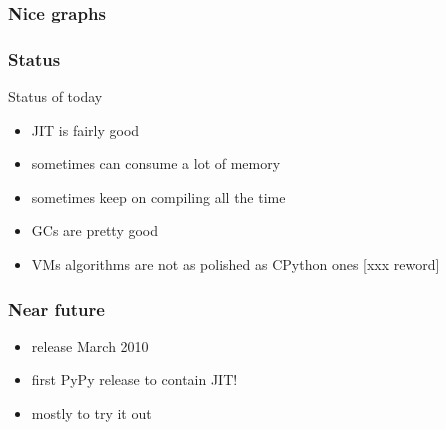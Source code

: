 \documentclass[utf8x, 14pt]{beamer}
\begin{document}
\begin{frame}
  \frametitle{Nice graphs}
\end{frame}

\begin{frame}
  \frametitle{Status}
  \begin{block}{Status of today}
    \begin{itemize}
    \item JIT is fairly good
      \pause
    \item sometimes can consume a lot of memory
      \pause
    \item sometimes keep on compiling all the time
      \pause
    \item GCs are pretty good
      \pause
    \item VMs algorithms are not as polished as CPython
      ones [xxx reword]
    \end{itemize}
  \end{block}
\end{frame}

\begin{frame}
  \frametitle{Near future}
  \begin{itemize}
    \item release March 2010
      \pause
    \item first PyPy release to contain JIT!
    \item mostly to try it out
  \end{itemize}
\end{frame}
\end{document}
